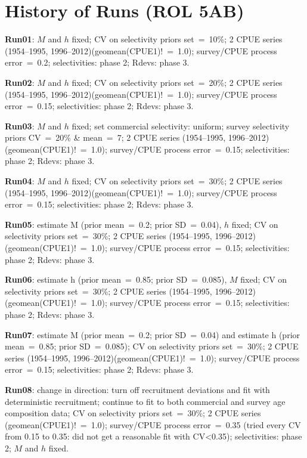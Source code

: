 
\section*{History of Runs (ROL 5AB)}

{\bf Run01}: $M$ and $h$ fixed; CV on selectivity priors set~=~10\%; 2 CPUE series (1954--1995, 1996--2012)(geomean(CPUE1)!~=~1.0); survey/CPUE process error~=~0.2; selectivities: phase 2; Rdevs: phase 3. \newline 

{\bf Run02}: $M$ and $h$ fixed; CV on selectivity priors set~=~20\%; 2 CPUE series (1954--1995, 1996--2012)(geomean(CPUE1)!~=~1.0); survey/CPUE process error~=~0.15; selectivities: phase 2; Rdevs: phase 3. \newline

{\bf Run03}: $M$ and $h$ fixed; set commercial selectivity: uniform; survey selectivity priors CV~=~20\% \& mean~=~7; 2 CPUE series (1954--1995, 1996--2012)(geomean(CPUE1)!~=~1.0); survey/CPUE process error~=~0.15; selectivities: phase 2; Rdevs: phase 3. \newline

{\bf Run04}: $M$ and $h$ fixed; CV on selectivity priors set~=~30\%; 2 CPUE series (1954--1995, 1996--2012)(geomean(CPUE1)!~=~1.0); survey/CPUE process error~=~0.15; selectivities: phase 2; Rdevs: phase 3. \newline

{\bf Run05}: estimate M (prior mean~=~0.2; prior SD~=~0.04), $h$ fixed; CV on selectivity priors set~=~30\%; 2 CPUE series (1954--1995, 1996--2012)(geomean(CPUE1)!~=~1.0); survey/CPUE process error~=~0.15; selectivities: phase 2; Rdevs: phase 3.  \newline

{\bf Run06}: estimate h (prior mean~=~0.85; prior SD~=~0.085), $M$ fixed; CV on selectivity priors set~=~30\%; 2 CPUE series (1954--1995, 1996--2012)(geomean(CPUE1)!~=~1.0); survey/CPUE process error~=~0.15; selectivities: phase 2; Rdevs: phase 3. \newline

{\bf Run07}: estimate M (prior mean~=~0.2; prior SD~=~0.04) and estimate h (prior mean~=~0.85; prior SD~=~0.085); CV on selectivity priors set~=~30\%; 2 CPUE series (1954--1995, 1996--2012)(geomean(CPUE1)!~=~1.0); survey/CPUE process error~=~0.15; selectivities: phase 2; Rdevs: phase 3. \newline

{\bf Run08}: change in direction: turn off recruitment deviations and fit with deterministic recruitment; continue to fit to both commercial and survey age composition data; CV on selectivity priors set~=~30\%; 2 CPUE series (geomean(CPUE1)!~=~1.0); survey/CPUE process error~=~0.35 (tried every CV from 0.15 to 0.35: did not get a reasonable fit with CV<0.35); selectivities: phase 2; $M$ and $h$ fixed. \newline

